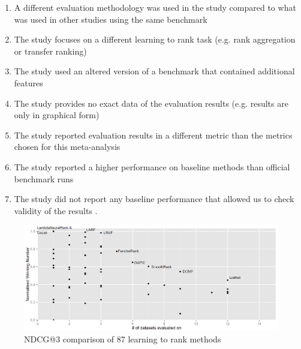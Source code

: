 \documentclass{sig-alternate}
\begin{document}
\begin{enumerate}
\item A different evaluation methodology was used in the study compared to what was used in other studies using the same benchmark \cite{Geng2011, Lin2012}
\item The study focuses on a different learning to rank task (e.g. rank aggregation or transfer ranking) \cite{De2011, De2010, Derhami2013, De2012, Chen2010, Ah-Pine2008, Wang2009c, De2013, Miao2013, Hoi2008, De2012b, Duh2011b, Argentini2012, Qin2010c, Volkovs2013, Desarkar2011, Pan2013, Lin2011b, Volkovs2012, Dammak2011}
\item The study used an altered version of a benchmark that contained additional features \cite{Bidoki2009, Ding2010}
\item The study provides no exact data of the evaluation results (e.g. results are only in graphical form) \cite{Wang2008, Wang2010, Xu2010, Kuo2009, Li2008, Xia2008, Zhou2011, Wu2011, Zhu2009, Karimzadehgan2011, Swersky2012, Pan2011, Ni2008, Ciaramita2008, Stewart2012, Petterson2009, Agarwal2010, Chang2009, Qin2008c, Adams2011, Sculley2009, Huang2008, Alejo2010, Sun2011, He2010b, Benbouzid2012, Geng2012, Chen2012, Xu2012, Shivaswamy2011}
\item The study reported evaluation results in a different metric than the metrics chosen for this meta-analysis \cite{Yu2009, Thuy2009, Pahikkala2009, Kersting2009, Mohan2011}
\item The study reported a higher performance on baseline methods than official benchmark runs \cite{Dubey2009, Banerjee2009, Peng2010b, Song2014, Bian2010, Bian2010b, Carvalho2008, Acharyya2012, Peng2010b, Tran2012, Asadi2013c}
\item The study did not report any baseline performance that allowed us to check validity of the results \cite{Chakrabarti2008, Wang2012b, Buffoni2011}.
\end{enumerate}

\begin{figure}
\includegraphics[scale=0.371]{gfx/ndcg3_winnum}
\caption{NDCG@3 comparison of 87 learning to rank methods}
\label{fig:normalized_winning_number_ndcg3}
\end{figure}
\end{document}
